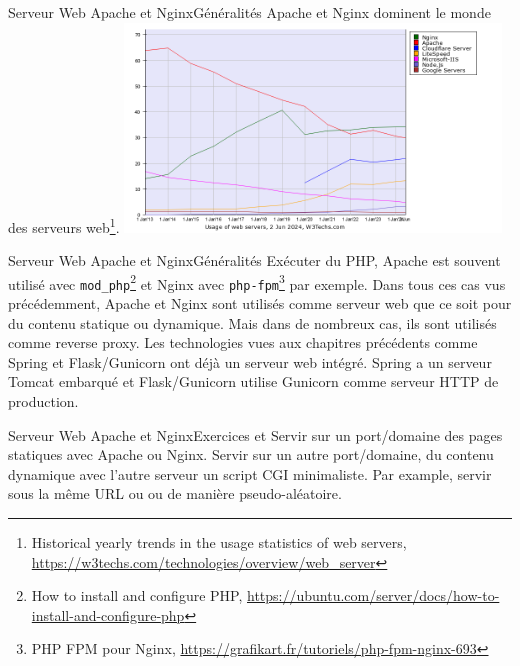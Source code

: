 \documentclass{beamer}
\begin{document}
    \begin{frame}{Serveur Web Apache et Nginx}{Généralités}
        Apache et Nginx dominent le monde des serveurs web\footnote{Historical yearly trends in the usage statistics of web servers, \url{https://w3techs.com/technologies/overview/web_server}}.
        \bigbreak
        \centering
        \includegraphics[width=10cm]{image/web-server-stats}
    \end{frame}

    \begin{frame}{Serveur Web Apache et Nginx}{Généralités}
        Exécuter du PHP, Apache est souvent utilisé avec \lstinline{mod_php}\footnote{How to install and configure PHP, \url{https://ubuntu.com/server/docs/how-to-install-and-configure-php}} et Nginx avec \lstinline{php-fpm}\footnote{PHP FPM pour Nginx, \url{https://grafikart.fr/tutoriels/php-fpm-nginx-693}} par exemple.
        \bigbreak
        Dans tous ces cas vus précédemment, Apache et Nginx sont utilisés comme serveur web que ce soit pour du contenu statique ou dynamique.
        \bigbreak
        Mais dans de nombreux cas, ils sont utilisés comme reverse proxy.
        Les technologies vues aux chapitres précédents comme Spring et Flask/Gunicorn ont déjà un serveur web intégré.
        Spring a un serveur Tomcat embarqué et Flask/Gunicorn utilise Gunicorn comme serveur HTTP de production.
    \end{frame}

    \begin{frame}{Serveur Web Apache et Nginx}{Exercices \execcounterdispinc{} et \execcounterdispinc{}}
        Servir sur un port/domaine des pages statiques avec Apache ou Nginx.
        \bigbreak
        Servir sur un autre port/domaine, du contenu dynamique avec l'autre serveur un script CGI minimaliste.
        Par example, servir sous la même URL  ou  ou  de manière pseudo-aléatoire.
    \end{frame}
\end{document}
